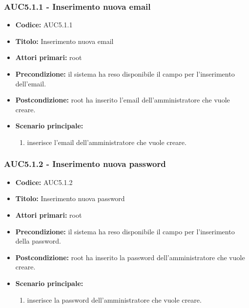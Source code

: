 \documentclass[casi-duso]{subfiles}
\begin{document}
\subsubsection{AUC5.1.1 - Inserimento nuova email}%
\label{subsub:AUC5.1.1}
\begin{itemize}
  \item \textbf{Codice:} AUC5.1.1
  \item \textbf{Titolo:} Inserimento nuova email
  \item \textbf{Attori primari:} root
  \item \textbf{Precondizione:} il sistema ha reso disponibile il campo per l'inserimento dell'email.
  \item \textbf{Postcondizione:} root ha inserito l'email dell'amministratore che vuole creare.
  \item \textbf{Scenario principale:}
  \begin{enumerate}
    \item {} inserisce l'email dell'amministratore che vuole creare.
  \end{enumerate}
\end{itemize}

\subsubsection{AUC5.1.2 - Inserimento nuova password}%
\label{subsub:AUC5.1.2}
\begin{itemize}
  \item \textbf{Codice:} AUC5.1.2
  \item \textbf{Titolo:} Inserimento nuova password
  \item \textbf{Attori primari:} root
  \item \textbf{Precondizione:} il sistema ha reso disponibile il campo per l'inserimento della password.
  \item \textbf{Postcondizione:} root ha inserito la password dell'amministratore che vuole creare.
  \item \textbf{Scenario principale:}
  \begin{enumerate}
    \item {} inserisce la password dell'amministratore che vuole creare.
  \end{enumerate}
\end{itemize}
\end{document}
